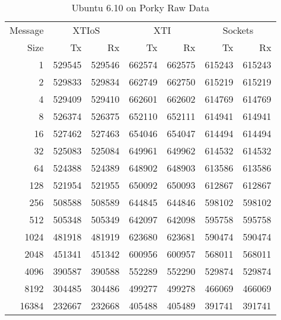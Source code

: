 \documentclass[letterpaper,final,notitlepage,twocolumn,10pt,twoside]{article}
\begin{document}
\begin{appendix}
\begin{table}[hbp]
\footnotesize
\begin{center}
\setlength{\tabcolsep}{0.3em}
\setlength{\arraycolsep}{0.3em}
\begin{tabular}{rrrrrrr}\\
Message & \multicolumn{2}{c}{XTIoS} & \multicolumn{2}{c}{XTI} & \multicolumn{2}{c}{Sockets}\\
Size & Tx & Rx & Tx & Rx & Tx & Rx\\
\hline
\hline
1 & 529545 & 529546 & 662574 & 662575 & 615243 & 615243\\
2 & 529833 & 529834 & 662749 & 662750 & 615219 & 615219\\
4 & 529409 & 529410 & 662601 & 662602 & 614769 & 614769\\
8 & 526374 & 526375 & 652110 & 652111 & 614941 & 614941\\
16 & 527462 & 527463 & 654046 & 654047 & 614494 & 614494\\
32 & 525083 & 525084 & 649961 & 649962 & 614532 & 614532\\
64 & 524388 & 524389 & 648902 & 648903 & 613586 & 613586\\
128 & 521954 & 521955 & 650092 & 650093 & 612867 & 612867\\
256 & 508588 & 508589 & 644845 & 644846 & 598102 & 598102\\
512 & 505348 & 505349 & 642097 & 642098 & 595758 & 595758\\
1024 & 481918 & 481919 & 623680 & 623681 & 590474 & 590474\\
2048 & 451341 & 451342 & 600956 & 600957 & 568011 & 568011\\
4096 & 390587 & 390588 & 552289 & 552290 & 529874 & 529874\\
8192 & 304485 & 304486 & 499277 & 499278 & 466069 & 466069\\
16384 & 232667 & 232668 & 405488 & 405489 & 391741 & 391741\\
\hline
\end{tabular}
\end{center}
\normalsize
\caption[Ubuntu 6.10 on Porky Raw Data]{Ubuntu 6.10 on Porky Raw Data}
\label{table:ubuntudata}
\end{table}


\end{appendix}
\end{document}
